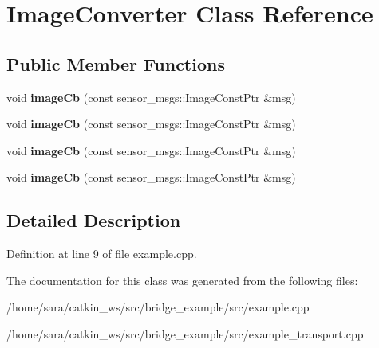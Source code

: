 \hypertarget{classImageConverter}{}\section{Image\+Converter Class Reference}
\label{classImageConverter}
\subsection*{Public Member Functions}
\begin{DoxyCompactItemize}
\item 
\mbox{\label{classImageConverter_ab70b33720d4f8b71be32e9e17201d0a3}} 
void {\bfseries image\+Cb} (const sensor\+\_\+msgs\+::\+Image\+Const\+Ptr \&msg)
\item 
\mbox{\label{classImageConverter_ab70b33720d4f8b71be32e9e17201d0a3}} 
void {\bfseries image\+Cb} (const sensor\+\_\+msgs\+::\+Image\+Const\+Ptr \&msg)
\item 
\mbox{\label{classImageConverter_ab70b33720d4f8b71be32e9e17201d0a3}} 
void {\bfseries image\+Cb} (const sensor\+\_\+msgs\+::\+Image\+Const\+Ptr \&msg)
\item 
\mbox{\label{classImageConverter_ab70b33720d4f8b71be32e9e17201d0a3}} 
void {\bfseries image\+Cb} (const sensor\+\_\+msgs\+::\+Image\+Const\+Ptr \&msg)
\end{DoxyCompactItemize}


\subsection{Detailed Description}


Definition at line 9 of file example.\+cpp.



The documentation for this class was generated from the following files\+:\begin{DoxyCompactItemize}
\item 
/home/sara/catkin\+\_\+ws/src/bridge\+\_\+example/src/example.\+cpp\item 
/home/sara/catkin\+\_\+ws/src/bridge\+\_\+example/src/example\+\_\+transport.\+cpp\end{DoxyCompactItemize}
